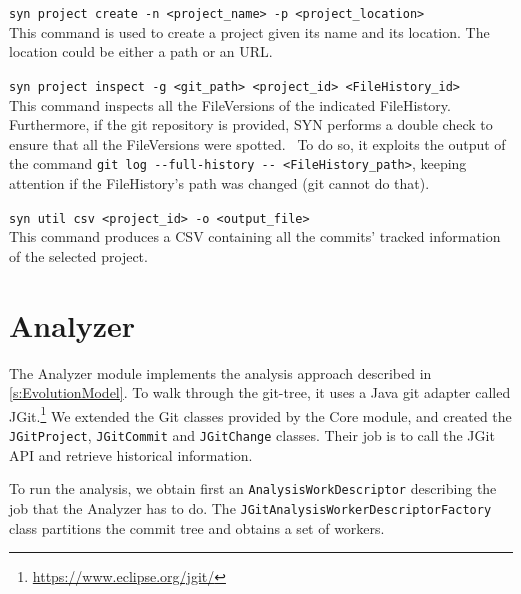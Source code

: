 \bigbreak
\noindent
\verb|syn project create -n <project_name> -p <project_location>| \\
\indent
This command is used to create a project given its name and its location. The location could be either a path or an URL. 

\bigbreak
\noindent
\verb|syn project inspect -g <git_path> <project_id> <FileHistory_id>|\\
\indent
This command inspects all the FileVersions of the indicated FileHistory. Furthermore, if the git repository is provided, SYN performs a double check to ensure that all the FileVersions were spotted. \
To do so, it exploits the output of the command \verb|git log --full-history -- <FileHistory_path>|, keeping attention if the FileHistory's path was changed (git cannot do that).


\bigbreak
\noindent
\verb|syn util csv <project_id> -o <output_file>|\\
\indent
This command produces a CSV containing all the commits' tracked information of the selected project. 


\section{Analyzer}
\label{sec:SYNAnalyzer}
The Analyzer module implements the analysis approach described in \autoref{s:EvolutionModel}.
To walk through the git-tree, it uses a Java git adapter called JGit.\footnote{\url{https://www.eclipse.org/jgit/}} 
We extended the Git classes provided by the Core module, and created the \texttt{JGitProject}, \texttt{JGitCommit} and \texttt{JGitChange} classes. Their job is to call the JGit API and retrieve historical information. 


To run the analysis, we obtain first an \texttt{AnalysisWorkDescriptor} describing the job that the Analyzer has to do. 
The \texttt{JGitAnalysisWorkerDescriptorFactory} class partitions the commit tree and obtains a set of workers. 

